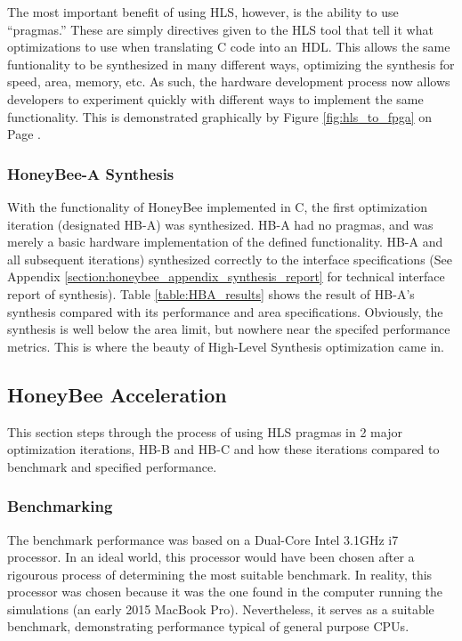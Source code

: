         The most important benefit of using \gls{HLS}, however, is the ability to use ``pragmas.'' These are simply directives given to the \gls{HLS} tool that tell it what optimizations to use when translating C code into an \gls{HDL}. This allows the same funtionality to be synthesized in many different ways, optimizing the synthesis for speed, area, memory, etc. As such, the hardware development process now allows developers to experiment quickly with different ways to implement the same functionality. This is demonstrated graphically by Figure \ref{fig:hls_to_fpga} on Page \pageref{fig:hls_to_fpga}.

        

    \subsubsection{HoneyBee-A Synthesis}
        With the functionality of HoneyBee implemented in C, the first optimization iteration (designated \gls{HB-A}) was synthesized. \gls{HB-A} had no pragmas, and was merely a basic hardware implementation of the defined functionality. \gls{HB-A} and all subsequent iterations) synthesized correctly to the interface specifications (See Appendix \ref{section:honeybee_appendix_synthesis_report} for technical interface report of synthesis). Table \ref{table:HBA_results} shows the result of \gls{HB-A}'s synthesis compared with its performance and area specifications. Obviously, the synthesis is well below the area limit, but nowhere near the specifed performance metrics. This is where the beauty of High-Level Synthesis optimization came in.

        

\newpage
\subsection{HoneyBee Acceleration}
    This section steps through the process of using \gls{HLS} \glspl{pragma} in 2 major optimization iterations, \gls{HB-B} and \gls{HB-C} and how these iterations compared to benchmark and specified performance.

    \subsubsection{Benchmarking}
        The benchmark performance was based on a Dual-Core Intel 3.1GHz i7 processor. In an ideal world, this processor would have been chosen after a rigourous process of determining the most suitable benchmark. In reality, this processor was chosen because it was the one found in the computer running the simulations (an early 2015 MacBook Pro). Nevertheless, it serves as a suitable benchmark, demonstrating performance typical of general purpose CPUs.

